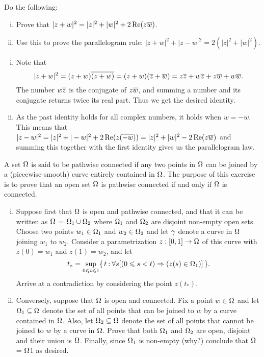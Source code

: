 \documentclass[12pt]{memoir}
\begin{document}
\begin{Ej}
    Do the following:
    \begin{enumerate}[i)]
        \itemsep=-0.4em
        \item Prove that $|z+w|^2=|z|^2+|w|^2+2\Re(z\overline w)$.
        \item Use this to prove the parallelogram rule: $|z+w|^2+|z-w|^2=2(|z|^2+|w|^2)$.
    \end{enumerate}
\end{Ej}

\begin{ptcbr}
    \begin{enumerate}[i)]
        \itemsep=-0.4em
        \item Note that 
        $$|z+w|^2=(z+w)\overline{(z+w)}=(z+w)(\overline z+\overline w)=z\overline{z}+w\overline{z}+z\overline{w}+w\overline w.$$
        The number $w\overline z$ is the conjugate of $z\overline w$, and summing a number and its conjugate returns twice its real part. Thus we get the desired identity. 
        \item As the past identity holds for all complex numbers, it holds when $w=-w$. This means that 
        $|z-w|^2=|z|^2+|-w|^2+2\Re(z(\overline{-w}))=|z|^2+|w|^2-2\Re(z\overline w)$
        and summing this together with the first identity gives us the parallelogram law.
    \end{enumerate}
\end{ptcbr}

\begin{Ej}
    A set $\Omega$ is said to be pathwise connected if any two points in $\Omega$ can be joined by a (piecewise-smooth) curve entirely contained in $\Omega$. The purpose of this exercise is to prove that an open set $\Omega$ is pathwise connected if and only if $\Omega$ is connected.
    \begin{enumerate}[i)]
        \itemsep=-0.4em
        \item Suppose first that $\Omega$ is open and pathwise connected, and that it can be written as $\Omega$ = $\Omega_1\cup\Omega_2$ where $\Omega_1$ and $\Omega_2$ are disjoint non-empty open sets. Choose two points $w_1\in\Omega_1$ and $w_2\in\Omega_2$ and let $\gamma$ denote a curve in $\Omega$ joining $w_1$ to $w_2$. Consider a parametrization $z:\left\lbrack0,1\right\rbrack\to\Omega$ of this curve with $z(0) = w_1$ and $z(1) = w_2$, and let
        $$t_\ast = \sup_{0\leqslant t\leqslant 1}\{\,t\mathbin{:}\forall s [(0\leqslant s<t)\Rightarrow (z(s)\in\Omega_1)]\,\}.$$
        Arrive at a contradiction by considering the point $z(t_\ast)$.
        \item Conversely, suppose that $\Omega$ is open and connected. Fix a point $w\in\Omega$ and let $\Omega_1\subseteq\Omega$ denote the set of all points that can be joined to $w$ by a curve contained in $\Omega$. Also, let $\Omega_2\subseteq\Omega$ denote the set of all points that cannot be joined to $w$ by a curve in $\Omega$. Prove that both $\Omega_1$ and $\Omega_2$ are open, disjoint and their union is $\Omega$. Finally, since $\Omega_1$ is non-empty (why?) conclude that $\Omega$ = $\Omega$1 as desired.
    \end{enumerate}
    \end{Ej}
\end{document}
